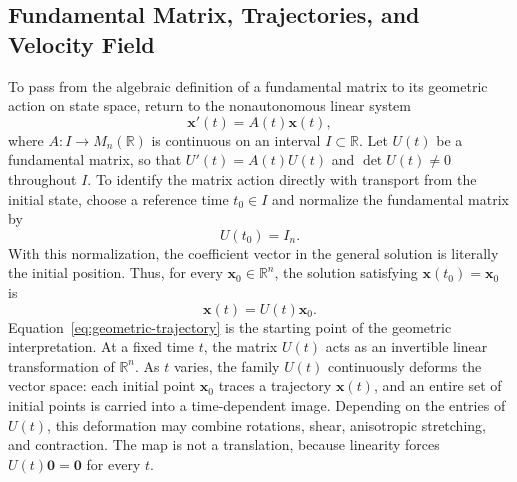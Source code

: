 \documentclass[11pt,a4paper]{article}
\newcommand{\be}{\begin{equation}}
\newcommand{\ee}{\end{equation}}
\newcommand{\lb}[1]{\label{#1}}
\newcommand{\R}{\mathbb{R}}
\theoremstyle{definition}
\numberwithin{equation}{section}
\begin{document}
\subsection{Fundamental Matrix, Trajectories, and Velocity Field}

To pass from the algebraic definition of a fundamental matrix to its geometric action on state space, return to the nonautonomous linear system
\be
\mathbf{x}'(t)=A(t)\mathbf{x}(t),
\lb{eq:geo-system}
\ee
where $A:I\rightarrow M_n(\R)$ is continuous on an interval $I\subset\R$. Let $U(t)$ be a fundamental matrix, so that $U'(t)=A(t)U(t)$ and $\det U(t)\neq0$ throughout $I$. To identify the matrix action directly with transport from the initial state, choose a reference time $t_0\in I$ and normalize the fundamental matrix by
\be
U(t_0)=I_n.
\lb{eq:geo-normalization}
\ee
With this normalization, the coefficient vector in the general solution is literally the initial position. Thus, for every $\mathbf{x}_0\in\R^n$, the solution satisfying $\mathbf{x}(t_0)=\mathbf{x}_0$ is
\be
\mathbf{x}(t)=U(t)\mathbf{x}_0.
\lb{eq:geometric-trajectory}
\ee
Equation~\eqref{eq:geometric-trajectory} is the starting point of the geometric interpretation. At a fixed time $t$, the matrix $U(t)$ acts as an invertible linear transformation of $\R^n$. As $t$ varies, the family $U(t)$ continuously deforms the vector space: each initial point $\mathbf{x}_0$ traces a trajectory $\mathbf{x}(t)$, and an entire set of initial points is carried into a time-dependent image. Depending on the entries of $U(t)$, this deformation may combine rotations, shear, anisotropic stretching, and contraction. The map is not a translation, because linearity forces $U(t)\mathbf{0}=\mathbf{0}$ for every $t$.
\end{document}
